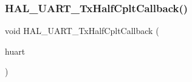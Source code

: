 \subsubsection{\texorpdfstring{H\+A\+L\+\_\+\+U\+A\+R\+T\+\_\+\+Tx\+Half\+Cplt\+Callback()}{HAL\_UART\_TxHalfCpltCallback()}}
{\footnotesize\ttfamily void H\+A\+L\+\_\+\+U\+A\+R\+T\+\_\+\+Tx\+Half\+Cplt\+Callback (\begin{DoxyParamCaption}\item[{\hyperlink{group___u_a_r_t___exported___types_ga7adf4f3e4c3ecde572be5925c915a967}{U\+A\+R\+T\+\_\+\+Handle\+Type\+Def} $\ast$}]{huart }\end{DoxyParamCaption})}

